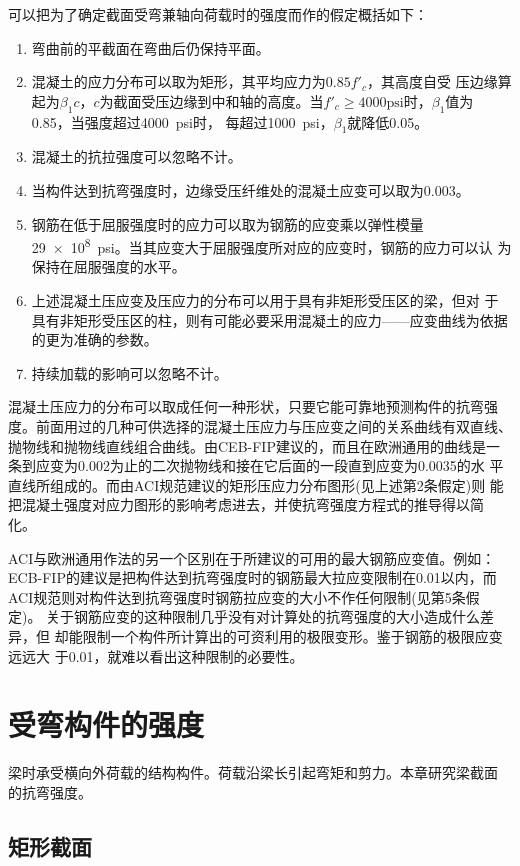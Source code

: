 \documentclass[12pt,a4paper]{book}
\begin{document}
可以把为了确定截面受弯兼轴向荷载时的强度而作的假定概括如下：
\begin{enumerate}
\item 弯曲前的平截面在弯曲后仍保持平面。
\item 混凝土的应力分布可以取为矩形，其平均应力为$0.85f'_c$，其高度自受
  压边缘算起为$\beta_1c$，$c$为截面受压边缘到中和轴的高度。当$f'_c \ge
  4000\mathrm{psi}$时，$\beta_1$值为0.85，当强度超过\SI{4000}{psi}时，
  每超过\SI{1000}{psi}，$\beta_1$就降低0.05。
\item 混凝土的抗拉强度可以忽略不计。
\item 当构件达到抗弯强度时，边缘受压纤维处的混凝土应变可以取为0.003。
\item 钢筋在低于屈服强度时的应力可以取为钢筋的应变乘以弹性模量
  \SI{29e8}{psi}。当其应变大于屈服强度所对应的应变时，钢筋的应力可以认
  为保持在屈服强度的水平。
\item 上述混凝土压应变及压应力的分布可以用于具有非矩形受压区的梁，但对
  于具有非矩形受压区的柱，则有可能必要采用混凝土的应力——应变曲线为依据
  的更为准确的参数。
\item 持续加载的影响可以忽略不计。
\end{enumerate}
混凝土压应力的分布可以取成任何一种形状，只要它能可靠地预测构件的抗弯强
度。前面用过的几种可供选择的混凝土压应力与压应变之间的关系曲线有双直线、
抛物线和抛物线直线组合曲线。由CEB-FIP建议的，而且在欧洲通用的曲线是一
条到应变为0.002为止的二次抛物线和接在它后面的一段直到应变为0.0035的水
平直线所组成的。而由ACI规范建议的矩形压应力分布图形(见上述第2条假定)则
能把混凝土强度对应力图形的影响考虑进去，并使抗弯强度方程式的推导得以简
化。

ACI与欧洲通用作法的另一个区别在于所建议的可用的最大钢筋应变值。例如：
ECB-FIP的建议是把构件达到抗弯强度时的钢筋最大拉应变限制在0.01以内，而
ACI规范则对构件达到抗弯强度时钢筋拉应变的大小不作任何限制(见第5条假定)。
关于钢筋应变的这种限制几乎没有对计算处的抗弯强度的大小造成什么差异，但
却能限制一个构件所计算出的可资利用的极限变形。鉴于钢筋的极限应变远远大
于0.01，就难以看出这种限制的必要性。

\chapter{受弯构件的强度}

梁时承受横向外荷载的结构构件。荷载沿梁长引起弯矩和剪力。本章研究梁截面
的抗弯强度。

\section{矩形截面}
\end{document}
